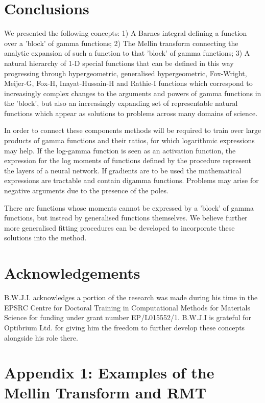 \documentclass{article}
\begin{document}
\section{Conclusions}
We presented the following concepts: 1) A Barnes integral defining a function over a 'block' of gamma functions; 2) The Mellin transform connecting the analytic expansion of such a function to that 'block' of gamma functions; 3) A natural hierarchy of 1-D special functions that can be defined in this way progressing through hypergeometric, generalised hypergeometric, Fox-Wright, Meijer-G, Fox-H, Inayat-Hussain-H and Rathie-I functions which correspond to increasingly complex changes to the arguments and powers of gamma functions in the 'block', but also an increasingly expanding set of representable natural functions which appear as solutions to problems across many domains of science.


In order to connect these components methods will be required to train over large products of gamma functions and their ratios, for which logarithmic expressions may help. If the log-gamma function is seen as an activation function, the expression for the log moments of functions defined by the procedure represent the layers of a neural network. If gradients are to be used the mathematical expressions are tractable and contain digamma functions. Problems may arise for negative arguments due to the presence of the poles.

There are functions whose moments cannot be expressed by a 'block' of gamma functions, but instead by generalised functions themselves. We believe further more generalised fitting procedures can be developed to incorporate these solutions into the method.




\section{Acknowledgements}
B.W.J.I. acknowledges a portion of the research was made during his time in the EPSRC Centre for Doctoral Training in Computational Methods for Materials Science for funding under grant number EP/L015552/1. B.W.J.I is grateful for Optibrium Ltd. for giving him the freedom to further develop these concepts alongside his role there.







\section{Appendix 1: Examples of the Mellin Transform and RMT}
\end{document}
